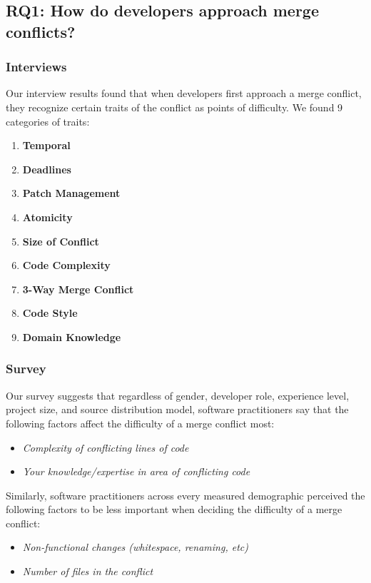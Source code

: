 \subsection{RQ1: How do developers approach merge conflicts?}

\subsubsection{Interviews}

Our interview results found that when developers first approach a merge conflict, they recognize certain traits of the conflict as points of difficulty. We found 9 categories of traits:
\begin{enumerate}
\item \textbf{Temporal}
\item \textbf{Deadlines}
\item \textbf{Patch Management}
\item \textbf{Atomicity}
\item \textbf{Size of Conflict}
\item \textbf{Code Complexity}
\item \textbf{3-Way Merge Conflict}
\item \textbf{Code Style}
\item \textbf{Domain Knowledge}
\end{enumerate}


\subsubsection{Survey}
Our survey suggests that regardless of gender, developer role, experience level, project size, and source distribution model, software practitioners say that the following factors affect the difficulty of a merge conflict most: 
\begin{itemize}
\item \textit{Complexity of conflicting lines of code}
\item \textit{Your knowledge/expertise in area of conflicting code}
\end{itemize}

Similarly, software practitioners across every measured demographic perceived the following factors to be less important when deciding the difficulty of a merge conflict:
\begin{itemize}
\item \textit{Non-functional changes (whitespace, renaming, etc)}
\item \textit{Number of files in the conflict}
\end{itemize}


